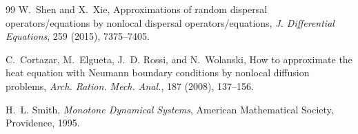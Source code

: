 \documentclass[11pt]{article}
\theoremstyle{definition}
\begin{document}
\begin{thebibliography}{99}
W.~Shen and X.~Xie,
\newblock Approximations of random dispersal operators/equations by nonlocal dispersal operators/equations,
\newblock \emph{J. Differential Equations}, 259 (2015), 7375--7405.

C.~Cortazar, M.~Elgueta, J.~D. Rossi, and N.~Wolanski,
\newblock How to approximate the heat equation with Neumann boundary conditions by nonlocal diffusion problems,
\newblock \emph{Arch. Ration. Mech. Anal.}, 187 (2008), 137--156.


H.~L. Smith,
\newblock \emph{Monotone Dynamical Systems},
\newblock American Mathematical Society, Providence, 1995.
\end{thebibliography}
\end{document}
